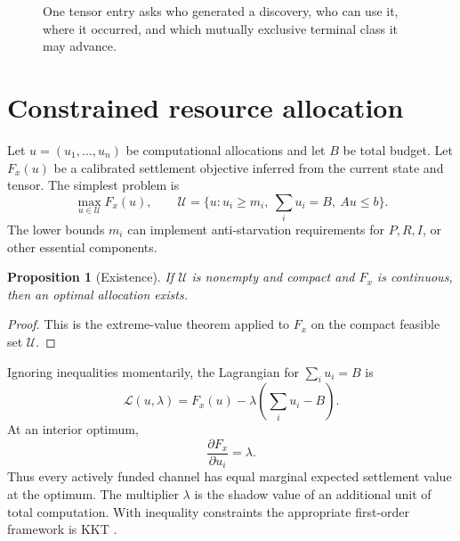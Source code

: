 \documentclass[11pt]{article}
\newtheorem{proposition}[theorem]{Proposition}
\begin{document}
\begin{figure}[ht]
\centering
{}
\caption{One tensor entry asks who generated a discovery, who can use it, where it occurred, and which mutually exclusive terminal class it may advance.}
\end{figure}

\section{Constrained resource allocation}
Let $u=(u_1,\ldots,u_n)$ be computational allocations and let $B$ be total budget. Let $F_x(u)$ be a calibrated settlement objective inferred from the current state and tensor. The simplest problem is
\[
\max_{u\in\mathcal U}F_x(u),\qquad
\mathcal U=\{u:u_i\ge m_i,\ \sum_i u_i=B,\ Au\le b\}.
\]
The lower bounds $m_i$ can implement anti-starvation requirements for $P,R,I$, or other essential components.

\begin{proposition}[Existence]
If $\mathcal U$ is nonempty and compact and $F_x$ is continuous, then an optimal allocation exists.
\end{proposition}
\begin{proof}
This is the extreme-value theorem applied to $F_x$ on the compact feasible set $\mathcal U$.
\end{proof}

Ignoring inequalities momentarily, the Lagrangian for $\sum_i u_i=B$ is
\[
\mathcal L(u,\lambda)=F_x(u)-\lambda\left(\sum_i u_i-B\right).
\]
At an interior optimum,
\[
\frac{\partial F_x}{\partial u_i}=\lambda.
\]
Thus every actively funded channel has equal marginal expected settlement value at the optimum. The multiplier $\lambda$ is the shadow value of an additional unit of total computation. With inequality constraints the appropriate first-order framework is KKT \cite{boyd,kuhn}.
\end{document}
